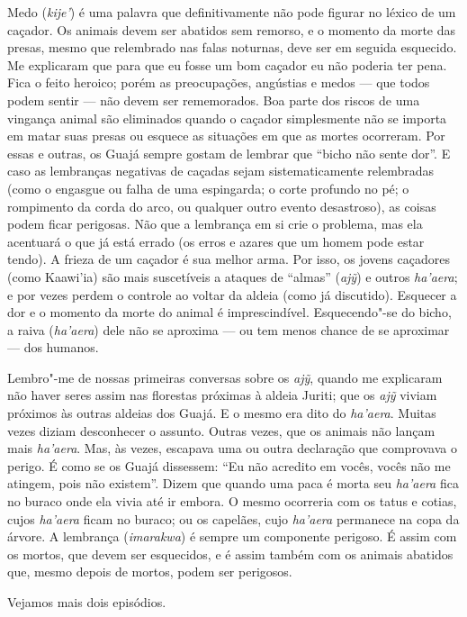 Medo (\emph{kije'}) é uma palavra que definitivamente não pode figurar
no léxico de um caçador. Os animais devem ser abatidos sem remorso, e o
momento da morte das presas, mesmo que relembrado nas falas noturnas,
deve ser em seguida esquecido. Me explicaram que para que eu fosse um
bom caçador eu não poderia ter pena. Fica o feito heroico; porém as
preocupações, angústias e medos --- que todos podem sentir --- não devem ser
rememorados. Boa parte dos riscos de uma vingança animal são eliminados
quando o caçador simplesmente não se importa em matar suas presas ou
esquece as situações em que as mortes ocorreram. Por essas e outras, os
Guajá sempre gostam de lembrar que ``bicho não sente dor''. E caso as
lembranças negativas de caçadas sejam sistematicamente relembradas (como
o engasgue ou falha de uma espingarda; o corte profundo no pé; o
rompimento da corda do arco, ou qualquer outro evento desastroso), as
coisas podem ficar perigosas. Não que a lembrança em si crie o problema,
mas ela acentuará o que já está errado (os erros e azares que um homem
pode estar tendo). A frieza de um caçador é sua melhor arma. Por isso,
os jovens caçadores (como Kaawi'ia) são mais suscetíveis a ataques de
``almas'' (\emph{ajỹ}) e outros \emph{ha'aera}; e por vezes perdem o
controle ao voltar da aldeia (como já discutido). Esquecer a dor e o
momento da morte do animal é imprescindível. Esquecendo"-se do bicho, a
raiva (\emph{ha'aera}) dele não se aproxima --- ou tem menos chance de se
aproximar --- dos humanos.

Lembro"-me de nossas primeiras conversas sobre os \emph{ajỹ}, quando me
explicaram não haver seres assim nas florestas próximas à aldeia Juriti;
que os \emph{ajỹ} viviam próximos às outras aldeias dos Guajá. E o mesmo
era dito do \emph{ha'aera}. Muitas vezes diziam desconhecer o assunto.
Outras vezes, que os animais não lançam mais \emph{ha'aera}. Mas, às
vezes, escapava uma ou outra declaração que comprovava o perigo. É como
se os Guajá dissessem: ``Eu não acredito em vocês, vocês não me atingem,
pois não existem''. Dizem que quando uma paca é morta seu \emph{ha'aera}
fica no buraco onde ela vivia até ir embora. O mesmo ocorreria com os
tatus e cotias, cujos \emph{ha'aera} ficam no buraco; ou os capelães,
cujo \emph{ha'aera} permanece na copa da árvore. A lembrança
(\emph{imarakwa}) é sempre um componente perigoso. É assim com os
mortos, que devem ser esquecidos, e é assim também com os animais
abatidos que, mesmo depois de mortos, podem ser perigosos.

Vejamos mais dois episódios.


